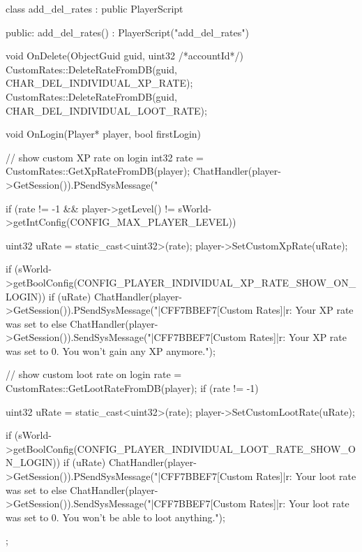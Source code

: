 class add_del_rates : public PlayerScript
{
public:
	add_del_rates() : PlayerScript("add_del_rates") { }

	void OnDelete(ObjectGuid guid, uint32 /*accountId*/)
	{
		CustomRates::DeleteRateFromDB(guid, CHAR_DEL_INDIVIDUAL_XP_RATE);
		CustomRates::DeleteRateFromDB(guid, CHAR_DEL_INDIVIDUAL_LOOT_RATE);
	}

	void OnLogin(Player* player, bool firstLogin)
	{
		// show custom XP rate on login
		int32 rate = CustomRates::GetXpRateFromDB(player);
		ChatHandler(player->GetSession()).PSendSysMessage("%

		if (rate != -1 && player->getLevel() != sWorld->getIntConfig(CONFIG_MAX_PLAYER_LEVEL))
		{
			uint32 uRate = static_cast<uint32>(rate);
			player->SetCustomXpRate(uRate);

			if (sWorld->getBoolConfig(CONFIG_PLAYER_INDIVIDUAL_XP_RATE_SHOW_ON_LOGIN))
			{
				if (uRate)
					ChatHandler(player->GetSession()).PSendSysMessage("|CFF7BBEF7[Custom Rates]|r: Your XP rate was set to %
				else
					ChatHandler(player->GetSession()).SendSysMessage("|CFF7BBEF7[Custom Rates]|r: Your XP rate was set to 0. You won't gain any XP anymore.");
			}
		}

		// show custom loot rate on login
		rate = CustomRates::GetLootRateFromDB(player);
		if (rate != -1)
		{
			uint32 uRate = static_cast<uint32>(rate);
			player->SetCustomLootRate(uRate);

			if (sWorld->getBoolConfig(CONFIG_PLAYER_INDIVIDUAL_LOOT_RATE_SHOW_ON_LOGIN))
			{
				if (uRate)
					ChatHandler(player->GetSession()).PSendSysMessage("|CFF7BBEF7[Custom Rates]|r: Your loot rate was set to %
				else
					ChatHandler(player->GetSession()).SendSysMessage("|CFF7BBEF7[Custom Rates]|r: Your loot rate was set to 0. You won't be able to loot anything.");
			}
		}
	}
};

